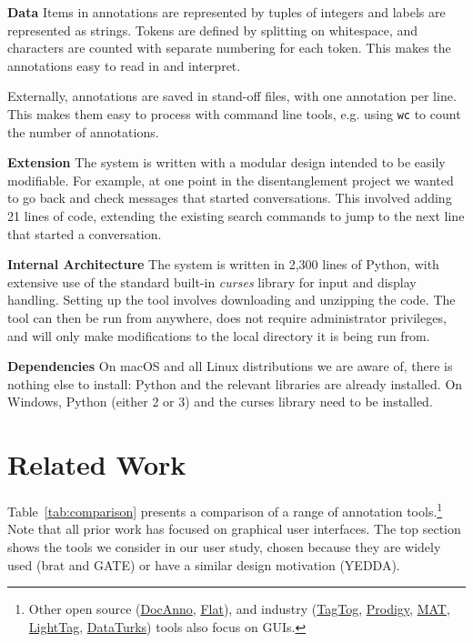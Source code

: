 \documentclass[11pt,a4paper]{article}
\makeatletter
\newcommand{\myeg}{e.g.\@\xspace}
\newcommand{\tightparagraph}[1]{\noindent\textbf{#1}}
\newcommand{\unixcmd}[1]{\texttt{#1}}
\makeatother
\begin{document}
\tightparagraph{Data}
Items in annotations are represented by tuples of integers and labels are represented as strings.
Tokens are defined by splitting on whitespace, and characters are counted with separate numbering for each token.
This makes the annotations easy to read in and interpret.

Externally, annotations are saved in stand-off files, with one annotation per line.
This makes them easy to process with command line tools, \myeg using \unixcmd{wc} to count the number of annotations.

\tightparagraph{Extension}
The system is written with a modular design intended to be easily modifiable.
For example, at one point in the disentanglement project we wanted to go back and check messages that started conversations.
This involved adding 21 lines of code, extending the existing search commands to jump to the next line that started a conversation.

\tightparagraph{Internal Architecture}
The system is written in 2,300 lines of Python, with extensive use of the standard built-in \emph{curses} library for input and display handling.
Setting up the tool involves downloading and unzipping the code.
The tool can then be run from anywhere, does not require administrator privileges, and will only make modifications to the local directory it is being run from.

\tightparagraph{Dependencies}
On macOS and all Linux distributions we are aware of, there is nothing else to install: Python and the relevant libraries are already installed.
On Windows, Python (either 2 or 3) and the curses library need to be installed.

\section{Related Work}

Table~\ref{tab:comparison} presents a comparison of a range of annotation tools.\footnote{
  Other open source (\href{https://github.com/chakki-works/doccano}{DocAnno}, \href{https://github.com/proycon/flat}{Flat}), and industry 
    (\href{https://www.tagtog.net/}{TagTog}, \href{https://prodi.gy/}{Prodigy}, \href{http://mat-annotation.sourceforge.net/}{MAT}, \href{https://www.lighttag.io/}{LightTag}, \href{https://dataturks.com/}{DataTurks})
    tools also focus on GUIs.
}
Note that all prior work has focused on graphical user interfaces.
The top section shows the tools we consider in our user study, chosen because they are widely used (brat and GATE) or have a similar design motivation (YEDDA).
\end{document}
